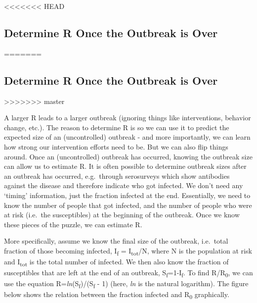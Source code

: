 \documentclass[]{book}
\theoremstyle{definition}
\theoremstyle{definition}
\theoremstyle{definition}
\theoremstyle{remark}
\begin{document}
<<<<<<< HEAD
\hypertarget{determine-r-once-the-outbreak-is-over}{%
\subsection{Determine R Once the Outbreak is
Over}\label{determine-r-once-the-outbreak-is-over}}
=======
\subsection{Determine R Once the Outbreak is
Over}\label{determine-r-once-the-outbreak-is-over}
>>>>>>> master

A larger R leads to a larger outbreak (ignoring things like
interventions, behavior change, etc.). The reason to determine R is so
we can use it to predict the expected size of an (uncontrolled) outbreak
- and more importantly, we can learn how strong our intervention efforts
need to be. But we can also flip things around. Once an (uncontrolled)
outbreak has occurred, knowing the outbreak size can allow us to
estimate R. It is often possible to determine outbreak sizes after an
outbreak has occurred, e.g.~through serosurveys which show antibodies
against the disease and therefore indicate who got infected. We don't
need any `timing' information, just the fraction infected at the end.
Essentially, we need to know the number of people that got infected, and
the number of people who were at risk (i.e.~the susceptibles) at the
beginning of the outbreak. Once we know these pieces of the puzzle, we
can estimate R.

More specifically, assume we know the final size of the outbreak,
i.e.~total fraction of those becoming infected, I\textsubscript{f} =
I\textsubscript{tot}/N, where N is the population at risk and
I\textsubscript{tot} is the total number of infected. We then also know
the fraction of susceptibles that are left at the end of an outbreak,
S\textsubscript{f}=1-I\textsubscript{f}. To find R/R\textsubscript{0},
we can use the equation
R=\emph{ln}(S\textsubscript{f})/(S\textsubscript{f} - 1) (here,
\emph{ln} is the natural logarithm). The figure below shows the relation
between the fraction infected and R\textsubscript{0} graphically.
\end{document}
